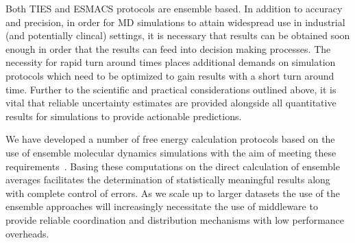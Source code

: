 Both TIES and ESMACS protocols are ensemble based. In addition to accuracy and
precision, in order for MD simulations to attain widespread use in industrial
(and potentially clincal) settings, it is necessary that results can be
obtained soon enough in order that the results can feed into decision making
processes. The necessity for rapid turn around times places additional demands
on simulation protocols which need to be optimized to gain results with a
short turn around time. Further to the scientific and practical considerations
outlined above, it is vital that reliable uncertainty estimates are provided
alongside all quantitative results for simulations to provide actionable
predictions.

We have developed a number of free energy calculation protocols based on the
use of ensemble molecular dynamics simulations with the aim of meeting these
requirements~\cite{Sadiq2008, Sadiq2010, Wan2017brd4, Wan2017trk}. Basing
these computations on the direct calculation of ensemble averages facilitates
the determination of statistically meaningful results along with complete
control of errors. As we scale up to larger datasets the use of the ensemble
approaches will increasingly necessitate the use of middleware to  provide
reliable coordination and distribution mechanisms with low performance
overheads.






